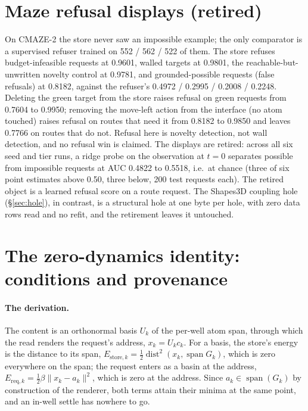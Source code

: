 \documentclass{article} %
\begin{document}
\section{Maze refusal displays (retired)}
\label{app:mazerefusal}

On CMAZE-2 the store never saw an impossible example; the only comparator is a supervised
refuser trained on 552 / 562 / 522 of them. The store refuses budget-infeasible requests at 0.9601,
walled targets at 0.9801, the reachable-but-unwritten novelty control at 0.9781, and
grounded-possible requests (false refusals) at 0.8182, against the refuser's 0.4972 / 0.2995 /
0.2008 / 0.2248. Deleting the green target from the store raises refusal on green requests from
0.7604 to 0.9950; removing the move-left action from the interface (no atom touched) raises
refusal on routes that need it from 0.8182 to 0.9850 and leaves 0.7766 on routes that do not.
Refusal here is novelty detection, not wall detection, and no refusal win is claimed. The displays
are retired: across all six seed and tier runs, a ridge probe on the observation at $t=0$ separates
possible from impossible requests at AUC 0.4822 to 0.5518, i.e.\ at chance (three of six point estimates above 0.50, three below, 200 test requests each). The retired object is a learned
refusal score on a route request. The Shapes3D coupling hole (\S\ref{sec:hole}), in contrast, is a
structural hole at one byte per hole, with zero data rows read and no refit, and the retirement
leaves it untouched. %

\section{The zero-dynamics identity: conditions and provenance}
\label{app:clue}

\paragraph{The derivation.} The content is an orthonormal basis $U_k$ of the per-well atom span,
through which the read renders the request's address, $x_k=U_k c_k$. For a basis, the store's
energy is the distance to its span,
$E_{\text{store},k}=\tfrac12\operatorname{dist}^2(x_k,\operatorname{span}G_k)$, which is zero
everywhere on the span; the request enters as a basin at the address, $E_{\text{req},k}=\tfrac12\beta\lVert
x_k-a_k\rVert^2$, which is zero at the address. Since $a_k\in\operatorname{span}(G_k)$ by
construction of the renderer, both terms attain their minima at the same point, and an in-well
settle has nowhere to go.
\end{document}
